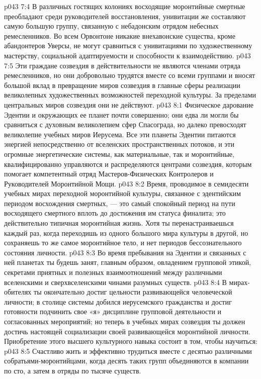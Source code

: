 \vs p043 7:4 В различных гостящих колониях восходящие моронтийные смертные преобладают среди руководителей восстановления, унивитации же составляют самую большую группу, связанную с небадонским отрядом небесных ремесленников. Во всем Орвонтоне никакие внехавонские существа, кроме абандонтеров Уверсы, не могут сравниться с унивитациями по художественному мастерству, социальной адаптируемости и способности к взаимодействию.
\vs p043 7:5 Эти граждане созвездия в действительности не являются членами отряда ремесленников, но они добровольно трудятся вместе со всеми группами и вносят большой вклад в превращение миров созвездия в главные сферы реализации великолепных художественных возможностей переходной культуры. За пределами центральных миров созвездия они не действуют.
\vs p043 8:1 Физическое дарование Эдентии и окружающих ее планет почти совершенно; они едва ли могли бы сравниться с духовным великолепием сфер Спасограда, но далеко превосходят великолепие учебных миров Иерусема. Все эти планеты Эдентии питаются энергией непосредственно от вселенских пространственных потоков, и эти огромные энергетические системы, как материальные, так и моронтийные, квалифицированно управляются и распределяются центрами созвездия, которым помогает компетентный отряд Мастеров\hyp{}Физических Контролеров и Руководителей Моронтийной Мощи.
\vs p043 8:2 Время, проводимое в семидесяти учебных мирах переходной моронтийной культуры, связанное с эдентийским периодом восхождения смертных, --- это самый спокойный период на пути восходящего смертного вплоть до достижения им статуса финалита; это действительно типичная моронтийная жизнь. Хотя ты перенастраиваешься каждый раз, когда переходишь из одного большого мира культуры в другой, но сохраняешь то же самое моронтийное тело, и нет периодов бессознательного состояния личности.
\vs p043 8:3 Во время пребывания на Эдентии и связанных с ней планетах ты будешь занят, главным образом, овладением групповой этикой, секретами приятных и полезных взаимоотношений между различными вселенскими и сверхвселенскими чинами разумных существ.
\vs p043 8:4 В мирах\hyp{}обителях ты окончательно достиг цельности развивающейся человеческой личности; в столице системы добился иерусемского гражданства и достиг готовности подчинить свое «я» дисциплине групповой деятельности и согласованных мероприятий; но теперь в учебных мирах созвездия ты должен достичь настоящей социализации своей развивающейся моронтийной личности. Приобретение этого высшего культурного навыка состоит в том, чтобы научиться:
\vs p043 8:5 \bibnobreakspace Счастливо жить и эффективно трудиться вместе с десятью различными собратьями\hyp{}моронтийцами, когда десять таких групп объединяются в компании по сто, а затем в отряды по тысяче существ.
